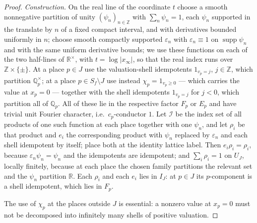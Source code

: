 \documentclass[11pt]{amsart}
\theoremstyle{definition}
\theoremstyle{remark}
\newcommand{\R}{\mathbb R}
\newcommand{\Z}{\mathbb Z}
\newcommand{\Q}{\mathbb Q}
\newcommand{\supp}{\operatorname{supp}}
\begin{document}
\begin{proof}
\emph{Construction.}  On the real line of the coordinate $t$ choose a
smooth nonnegative partition of unity $(\psi_n)_{n\in\Z}$ with
$\sum_n\psi_n=1$, each $\psi_n$ supported in the translate by $n$ of a fixed
compact interval, and with derivatives bounded uniformly in $n$; choose smooth
compactly supported $\varepsilon_n$ with $\varepsilon_n\equiv1$ on
$\supp\psi_n$ and with the same uniform derivative bounds; we use these functions on each
of the two half-lines of $\R^{\times}$, with $t=\log|x_{\infty}|$, so that the
real index runs over $\Z\times\{\pm\}$.  At a place $p\in J$
use the valuation-shell idempotents $1_{v_p=j}$, $j\in\Z$, which partition
$\Q_p^{\times}$; at a place $p\in S_f\setminus J$ use instead $\chi_p=1_{v_p\ge
0}$ --- which carries the value at $x_p=0$ --- together with the shell
idempotents $1_{v_p=j}$ for $j<0$, which partition all of $\Q_p$.  All of these
lie in the respective factor $F_p$ or $E_p$ and have trivial unit Fourier
character, i.e.\ $c_p$-conductor $1$.  Let $\mathcal I$ be the index set of all
products of one such function at each place together with one $\psi_n$, and let
$\rho_i$ be that product and $e_i$ the corresponding product with $\psi_n$
replaced by $\varepsilon_n$ and each shell idempotent by itself; place both at
the identity lattice label.  Then $e_i\rho_i=\rho_i$, because
$\varepsilon_n\psi_n=\psi_n$ and the idempotents are idempotent; and
$\sum_i\rho_i=1$ on $U_J$, locally finitely, because at each place the chosen
family partitions the relevant set and the $\psi_n$ partition $\R$.  Each
$\rho_i$ and each $e_i$ lies in $I_J$: at $p\in J$ its $p$-component is a
shell idempotent, which lies in $F_p$.

The use of $\chi_p$ at the places outside $J$ is essential: a nonzero value at
$x_p=0$ must not be decomposed into infinitely many shells of positive
valuation.


\end{proof}
\end{document}

